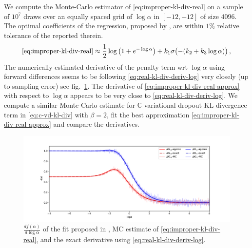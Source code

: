 \documentclass[a4paper,10pt]{article}
\newcommand{\cplx}{\mathbb{C}}
\begin{document}
We compute the Monte-Carlo estimator of \eqref{eq:improper-kl-div-real} on a sample of $10^7$
draws over an equally spaced grid of $\log \alpha$ in $[-12, +12]$ of size $4096$. The optimal
coefficients of the regression, proposed by \citet{molchanov_variational_2017}, are within
$1\%$ relative tolerance of the reported therein.
\begin{equation}  \label{eq:improper-kl-div-real-approx}
  \eqref{eq:improper-kl-div-real}
  \approx
    \frac12 \log{\bigl(1 + e^{-\log \alpha}\bigr)}
    + k_1 \sigma\bigl(- (k_2 + k_3 \log \alpha)\bigr)
  \,,
\end{equation}
The numerically estimated derivative of the penalty term wrt $\log \alpha$ using forward
differences seems to be following \eqref{eq:real-kl-div-deriv-log} very closely (up to
sampling error) see fig.~\ref{fig:molchanov-derivative-replica}. The derivative of
\eqref{eq:improper-kl-div-real-approx} with respect to $\log \alpha$ appears to be very close
to \eqref{eq:real-kl-div-deriv-log}. We compute a similar Monte-Carlo estimate for
$\cplx$ variational dropout KL divergence term in \eqref{eq:c-vd-kl-div} with $\beta = 2$,
fit the best approximation \eqref{eq:improper-kl-div-real-approx} and compare the derivatives.

\begin{figure}[!ht]
  \centering
  \includegraphics[width=1.\linewidth]{../notebooks/assets/grad_log.pdf}
  \caption{$\tfrac{d f(\alpha)}{d \log{\alpha}}$ of the fit proposed in
  \citet{molchanov_variational_2017}, MC estimate of \eqref{eq:improper-kl-div-real},
  and the exact derivative using \eqref{eq:real-kl-div-deriv-log}.}
  \label{fig:molchanov-derivative-replica}
\end{figure}
\end{document}
